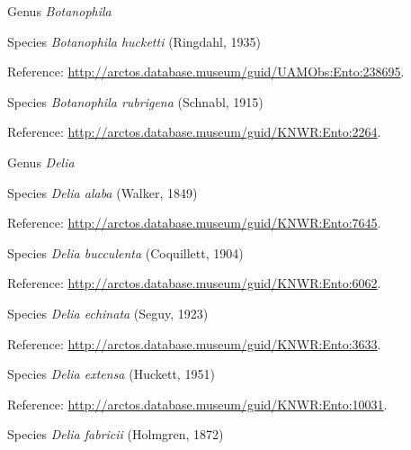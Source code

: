 \documentclass[9pt, article]{memoir}
\begin{document}
\begin{multicols}{2}
\vspace{6pt}\noindent\hspace{30pt}Genus \textit{Botanophila}


\vspace{6pt}\noindent\hspace{36pt}Species \textit{Botanophila hucketti} (Ringdahl, 1935)


\vspace{6pt}Reference: 
\url{http://arctos.database.museum/guid/UAMObs:Ento:238695}.

\vspace{6pt}\noindent\hspace{36pt}Species \textit{Botanophila rubrigena} (Schnabl, 1915)


\vspace{6pt}Reference: 
\url{http://arctos.database.museum/guid/KNWR:Ento:2264}.

\vspace{6pt}\noindent\hspace{30pt}Genus \textit{Delia}


\vspace{6pt}\noindent\hspace{36pt}Species \textit{Delia alaba} (Walker, 1849)


\vspace{6pt}Reference: 
\url{http://arctos.database.museum/guid/KNWR:Ento:7645}.

\vspace{6pt}\noindent\hspace{36pt}Species \textit{Delia bucculenta} (Coquillett, 1904)


\vspace{6pt}Reference: 
\url{http://arctos.database.museum/guid/KNWR:Ento:6062}.

\vspace{6pt}\noindent\hspace{36pt}Species \textit{Delia echinata} (Seguy, 1923)


\vspace{6pt}Reference: 
\url{http://arctos.database.museum/guid/KNWR:Ento:3633}.

\vspace{6pt}\noindent\hspace{36pt}Species \textit{Delia extensa} (Huckett, 1951)


\vspace{6pt}Reference: 
\url{http://arctos.database.museum/guid/KNWR:Ento:10031}.

\vspace{6pt}\noindent\hspace{36pt}Species \textit{Delia fabricii} (Holmgren, 1872)



\end{multicols}
\end{document}
